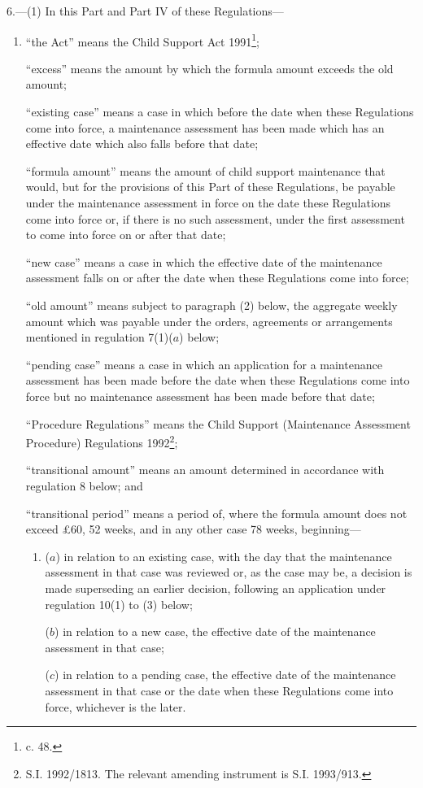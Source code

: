 \documentclass[12pt,a4paper]{article}
\begin{document}
6.—(1) In this Part and Part IV of these Regulations—
\begin{enumerate}\item[]
“the Act” means the Child Support Act 1991\footnote{ c. 48.};

“excess” means the amount by which the formula amount exceeds the old amount;

“existing case” means a case in which before the date when these Regulations come into force, a maintenance assessment has been made which has an effective date which also falls before that date;

“formula amount” means the amount of child support maintenance that would, but for the provisions of this Part of these Regulations, be payable under the maintenance assessment in force on the date these Regulations come into force or, if there is no such assessment, under the first assessment to come into force on or after that date;

“new case” means a case in which the effective date of the maintenance assessment falls on or after the date when these Regulations come into force;

“old amount” means subject to paragraph (2) below, the aggregate weekly amount which was payable under the orders, agreements or arrangements mentioned in regulation 7(1)($a$) below;

“pending case” means a case in which an application for a maintenance assessment has been made before the date when these Regulations come into force but no maintenance assessment has been made before that date;

“Procedure Regulations” means the Child Support (Maintenance Assessment Procedure) Regulations 1992\footnote{\frenchspacing S.I. 1992/1813. The relevant amending instrument is S.I. 1993/913.};

“transitional amount” means an amount determined in accordance with regulation 8 below; and

“transitional period” means a period of, where the formula amount does not exceed £60, 52 weeks, and in any other case 78 weeks, beginning—
\begin{enumerate}\item[]
($a$) in relation to an existing case, with the day that the maintenance assessment in that case 
was reviewed or, as the case may be, a decision is made superseding an earlier decision,  %
following an application under regulation 10(1) to (3) below;

($b$) in relation to a new case, the effective date of the maintenance assessment in that case;

($c$) in relation to a pending case, the effective date of the maintenance assessment in that case or the date when these Regulations come into force, whichever is the later.
\end{enumerate}
\end{enumerate}
\end{document}

